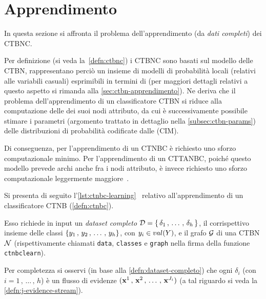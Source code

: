 \section{Apprendimento}\label{sec:learning-ctbnc}
In questa sezione si affronta il problema dell'apprendimento (da \emph{dati completi}) dei \acs{CTBNC}.

Per definizione (si veda la~\vref{defn:ctbnc}) i \acs{CTBNC} sono basati sul modello delle \acs{CTBN}, rappresentano perciò un insieme di modelli di probabilità locali (relativi alle variabili casuali) esprimibili in termini di \stats{} (per maggiori dettagli relativi a questo aspetto si rimanda alla \autoref{sec:ctbn-apprendimento}). Ne deriva che il problema dell'apprendimento di un classificatore \acs{CTBN} si riduce alla computazione delle \stats{} dei suoi nodi attributo, da cui è successivamente possibile stimare i parametri (argomento trattato in dettaglio nella \autoref{subsec:ctbn-params}) delle distribuzioni di probabilità codificate dalle \cim{} (\acs{CIM}).

Di conseguenza, per l'apprendimento di un \acs{CTNBC} è richiesto uno sforzo computazionale minimo. Per l'apprendimento di un \acs{CTTANBC}, poiché questo modello prevede archi anche fra i nodi attributo, è invece richiesto uno sforzo computazionale leggermente maggiore~\citep{Stella2012}.

Si presenta di seguito l'\autoref{lst:ctnbc-learning}~\citep{Stella2012} relativo all'apprendimento di un classificatore \acs{CTNB} (\autoref{defn:ctnbc}).

Esso richiede in input un \emph{dataset completo} $\mathcal{D}=\{\,\delta_1\,,\,\dotsc\,,\,\delta_h\,\}$, il corrispettivo insieme delle classi $\{\mathnormal{y}_1\,,\,\mathnormal{y}_2\,,\,\dotsc\,,\,\mathnormal{y}_h\}$, con $\mathnormal{y}_i \in val(\mathnormal{Y})$, e il grafo $\mathcal{G}$ di una \acs{CTBN} $\mathcal{N}$ (rispettivamente chiamati \lstinline[]|data|, \lstinline[]|classes| e \lstinline[]|graph| nella firma della funzione \lstinline[]|ctnbclearn|).

Per completezza si osservi (in base alla \autoref{defn:dataset-completo}) che ogni $\delta_i$ (con $i=1\,,\,\dotsc\,,\,h$) è un flusso di evidenze $(\mathbf{x}^1\,,\,\mathbf{x}^2\,,\,\dotsc\,,\,\mathbf{x}^{J_i})$ (a tal riguardo si veda la \autoref{defn:j-evidence-stream}).

